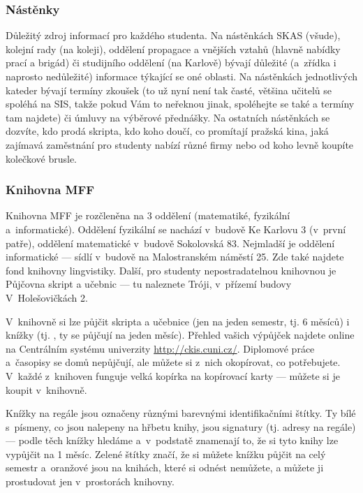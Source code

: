 \subsubsection{Nástěnky}
Důležitý zdroj informací pro každého studenta. Na nástěnkách SKAS
(všude), kolejní rady (na koleji), oddělení propagace a vnějších
vztahů (hlavně nabídky prací a brigád) či studijního oddělení (na
Karlově) bývají důležité (a~zřídka i naprosto nedůležité)
informace týkající se oné oblasti. Na nástěnkách jednotlivých
kateder bývají termíny zkoušek (to už nyní není tak časté, většina
učitelů se spoléhá na SIS, takže pokud Vám to neřeknou jinak,
spoléhejte se také a termíny tam najdete) či úmluvy na výběrové
přednášky. Na ostatních nástěnkách se dozvíte, kdo prodá skripta,
kdo koho doučí, co promítají pražská kina, jaká zajímavá
zaměstnání pro studenty nabízí různé firmy nebo od koho levně
koupíte kolečkové brusle.


\subsubsection{Knihovna MFF}

Knihovna MFF je rozčleněna na 3 oddělení (matematiké, fyzikální
a~informatické). Oddělení fyzikální se nachází v~budově Ke Karlovu 3
(v~první patře), oddělení matematické v~budově Sokolovská 83.
Nejmladší je oddělení informatické --- sídlí v~budově na
Malostranském náměstí 25. Zde také najdete fond knihovny
lingvistiky. Další, pro studenty nepostradatelnou knihovnou je
Půjčovna skript a učebnic --- tu naleznete Tróji, v~přízemí budovy
V~Holešovičkách 2.

V~knihovně si lze půjčit skripta a učebnice (jen na jeden semestr,
tj. 6 měsíců) i knížky (tj. , ty se půjčují na
jeden měsíc). Přehled vašich výpůjček najdete online na Centrálním
systému univerzity \url{http://ckis.cuni.cz/}. Diplomové práce
a~časopisy se domů nepůjčují, ale můžete si z~nich okopírovat, co
potřebujete. V~každé z~knihoven funguje velká kopírka na
kopírovací karty --- můžete si je koupit v~knihovně.

Knížky na regále jsou označeny různými barevnými identifikačními
štítky. Ty bílé s~písmeny, co jsou nalepeny na hřbetu knihy, jsou
signatury (tj. adresy na regále) --- podle těch knížky hledáme
a~v~podstatě znamenají to, že si tyto knihy lze vypůjčit na 1 měsíc.
Zelené štítky značí, že si můžete knížku půjčit na celý semestr
a~oranžové jsou na knihách, které si odnést nemůžete, a můžete ji
prostudovat jen v~prostorách knihovny.

